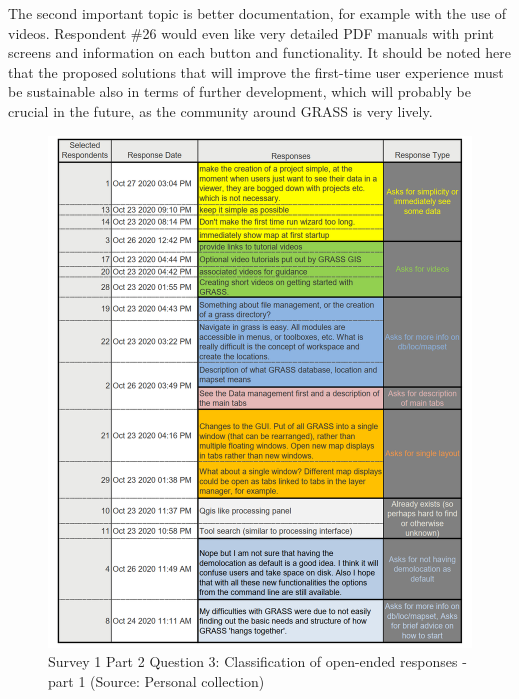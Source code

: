 \documentclass[a4paper,10pt,twoside]{article}
\begin{document}
The second important topic is better documentation, for example with
the use of videos. Respondent \#26 would even like very detailed PDF
manuals with print screens and information on each button and
functionality.  It should be noted here that the proposed solutions
that will improve the first-time user experience must be sustainable
also in terms of further development, which will probably be crucial
in the future, as the community around GRASS is very lively.
\newpage
\vspace{0.3cm}
\begin{figure}[hbt!] 
\begin{center}
\includegraphics[width=17cm]{../surveys/analyzed_data/survey1_part2_question3_open_ended-2_2.png} 
\caption[Survey 1 Part 2 Question 3: Classification of open-ended responses - part 1]{Survey 1 Part 2 Question 3: Classification of open-ended responses - part 1 (Source: Personal collection)}
\label{fig:survey1_part2_question3_open_ended-1_1}
\end{center}
\end{figure}
\end{document}
